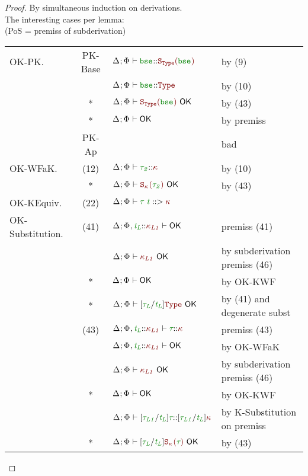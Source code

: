 \documentclass[11pt]{article}
\begin{document}
    \begin{proof}
        By simultaneous induction on derivations. \\
        The interesting cases per lemma: \\
        (PoS = premiss of subderivation)
        \begin{tabular*}{.5\textwidth}{lc@{\extracolsep{\fill}}ll}
            OK-PK.
                &PK-Base& $\WellFormedAtKind{\bse}[\SKind[\Type][\bse]]$ & by (9) \\
                & & $\WellFormedAtKind{\bse}[\Type]$ & by (10) \\
                &*& $\KindWellFormed[{\SKind[\Type][\bse]}]$ & by (43) \\
                &*& $\ContextWellFormed$ & by premiss \\
                &PK-Ap& & bad \\
            OK-WFaK.
                &(12)& $\WellFormedAtKind{\typ[2]}$ & by (10) \\
                &*& $\KindWellFormed[{\SKind[\knd][\typ[2]]}]$ & by (43) \\
            OK-KEquiv.
                &(22)& $\PrincipalKind{\TypeAp[\typ][\typvar]}$ & \\
            OK-Substitution.
                &(41)& $\ContextWellFormed[\HoleCtx\ExtendTypVarCtx[][L][{\knd[L1]}]]$ & premiss (41) \\
                & & $\KindWellFormed[{\knd[L1]}]$ & by subderivation premiss (46) \\
                &*& $\ContextWellFormed$ & by OK-KWF \\
                &*& $\KindWellFormed[\subst{\typ[L]}{\typvar[L]}{\Type}]$ & by (41) and degenerate subst \\
                &(43)& $\WellFormedAtKind[\HoleCtx\ExtendTypVarCtx[][L][{\knd[L1]}]]{\typ}[\knd]$ & premiss (43) \\
                & & $\ContextWellFormed[\HoleCtx\ExtendTypVarCtx[][L][{\knd[L1]}]]$ & by OK-WFaK \\
                & & $\KindWellFormed[{\knd[L1]}]$ & by subderivation premiss (46) \\
                &*& $\ContextWellFormed$ & by OK-KWF \\
                & & $\WellFormedAtKind{\subst{\typ[L1]}{\typvar[L]}{\typ}}[\subst{\typ[L1]}{\typvar[L]}{\knd}]$ & by K-Substitution on premiss \\
                &*& $\KindWellFormed[\subst{\typ[L]}{\typvar[L]}{\SKind}]$ & by (43) \\
        \end{tabular*}
    \end{proof}
\end{document}
